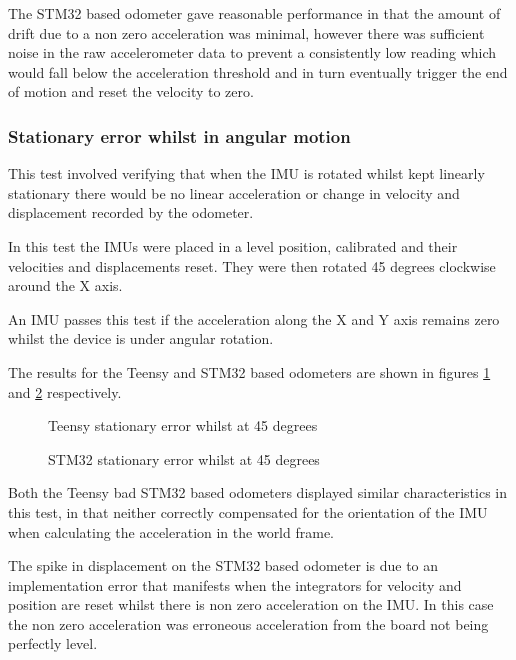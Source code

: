 \documentclass{entcs}
\begin{document}
The STM32 based odometer gave reasonable performance in that the amount of drift
due to a non zero acceleration was minimal, however there was sufficient noise
in the raw accelerometer data to prevent a consistently low reading which would
fall below the acceleration threshold and in turn eventually trigger the end of
motion and reset the velocity to zero.

\subsubsection{Stationary error whilst in angular motion}
\label{sec:stat_error_45deg}

This test involved verifying that when the IMU is rotated whilst kept linearly
stationary there would be no linear acceleration or change in velocity and
displacement recorded by the odometer.

In this test the IMUs were placed in a level position, calibrated and their
velocities and displacements reset. They were then rotated 45 degrees clockwise
around the X axis.

An IMU passes this test if the acceleration along the X and Y axis remains zero
whilst the device is under angular rotation.

The results for the Teensy and STM32 based odometers are shown in figures
\ref{fig:teensy_stationary_45deg_error} and
\ref{fig:stm32_stationary_45deg_error} respectively.

\begin{figure}[h!]
  \centering
  \scalebox{0.7}{}
  \caption{Teensy stationary error whilst at 45 degrees}
  \label{fig:teensy_stationary_45deg_error}
\end{figure}

\begin{figure}[h!]
  \centering
  \scalebox{0.7}{}
  \caption{STM32 stationary error whilst at 45 degrees}
  \label{fig:stm32_stationary_45deg_error}
\end{figure}

Both the Teensy bad STM32 based odometers displayed similar characteristics in
this test, in that neither correctly compensated for the orientation of the IMU
when calculating the acceleration in the world frame.

The spike in displacement on the STM32 based odometer is due to an
implementation error that manifests when the integrators for velocity and
position are reset whilst there is non zero acceleration on the IMU. In this
case the non zero acceleration was erroneous acceleration from the board not
being perfectly level.
\end{document}
